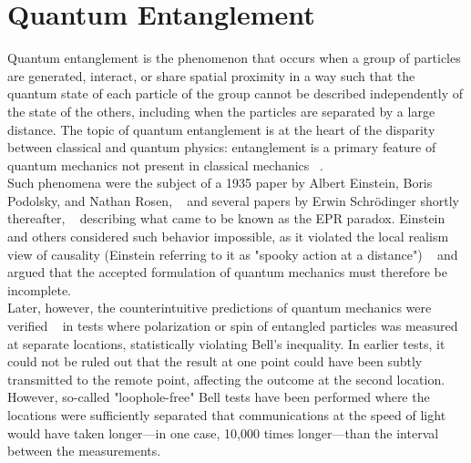 \documentclass[12pt , a4paper]{article}
\begin{document}
\maketitle
\clearpage
{}

\section*{Quantum Entanglement}
Quantum entanglement is the phenomenon that occurs when a group of particles are generated, interact, or share spatial proximity in a way such that the quantum state of each particle of the group cannot be described independently of the state of the others, including when the particles are separated by a large distance. The topic of quantum entanglement is at the heart of the disparity between classical and quantum physics: entanglement is a primary feature of quantum mechanics not present in classical mechanics ~\cite{1}. \\
Such phenomena were the subject of a 1935 paper by Albert Einstein, Boris Podolsky, and Nathan Rosen, ~\cite{2} and several papers by Erwin Schrödinger shortly thereafter, ~\cite{3, 4} describing what came to be known as the EPR paradox. Einstein and others considered such behavior impossible, as it violated the local realism view of causality (Einstein referring to it as "spooky action at a distance") ~\cite{5} and argued that the accepted formulation of quantum mechanics must therefore be incomplete. \\
Later, however, the counterintuitive predictions of quantum mechanics were verified ~\cite{6, 7, 8} in tests where polarization or spin of entangled particles was measured at separate locations, statistically violating Bell's inequality. In earlier tests, it could not be ruled out that the result at one point could have been subtly transmitted to the remote point, affecting the outcome at the second location. ~\cite{8} However, so-called "loophole-free" Bell tests have been performed where the locations were sufficiently separated that communications at the speed of light would have taken longer—in one case, 10,000 times longer—than the interval between the measurements.\cite{7, 6}
\end{document}
